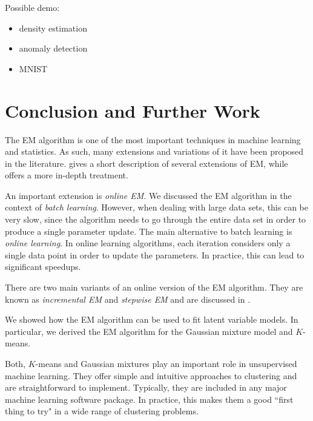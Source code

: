 \documentclass[final,3p,times,twocolumn]{elsarticle}
\begin{document}
Possible demo:
\begin{itemize}
\item density estimation
\item anomaly detection
\item MNIST
\end{itemize}




\section{Conclusion and Further Work}
\label{sect:concl}
The EM algorithm is one of the most important techniques in machine learning and statistics.
As such, many extensions and variations of it have been proposed in the literature.
\cite{Murphy} gives a short description of several extensions of EM, while \cite{mclachlan1997} offers a more in-depth treatment.

An important extension is \emph{online EM}.
We discussed the EM algorithm in the context of \emph{batch learning}. 
However, when dealing with large data sets, this can be very slow, since the algorithm needs to go through the entire data set in order to produce a single parameter update.
The main alternative to batch learning is \emph{online learning}. 
In online learning algorithms, each iteration considers only a single data point in order to update the parameters.
In practice, this can lead to significant speedups.

There are two main variants of an online version of the EM algorithm.
They are known as \emph{incremental EM} and \emph{stepwise EM} and are discussed in \cite{liang2009}.

We showed how the EM algorithm can be used to fit latent variable models.
In particular, we derived the EM algorithm for the Gaussian mixture model and $K$-means.

Both, $K$-means and Gaussian mixtures play an important role in unsupervised machine learning.
They offer simple and intuitive approaches to clustering and are straightforward to implement.
Typically, they are included in any major machine learning software package.
In practice, this makes them a good ``first thing to try" in a wide range of clustering problems.
\end{document}

